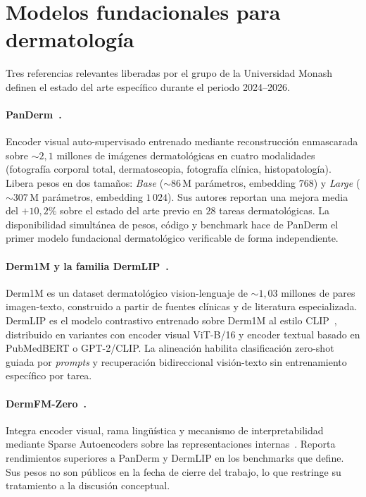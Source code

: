 \section{Modelos fundacionales para dermatología}
\label{sec:fundacionales-derma}

Tres referencias relevantes liberadas por el grupo de la Universidad
Monash definen el estado del arte específico durante el periodo
2024--2026.

\paragraph{PanDerm~\cite{panderm2025}.}
Encoder visual auto-supervisado entrenado mediante reconstrucción
enmascarada sobre $\sim 2{,}1$ millones de imágenes
dermatológicas en cuatro modalidades (fotografía corporal total,
dermatoscopia, fotografía clínica, histopatología). Libera pesos en
dos tamaños: \emph{Base} ($\sim 86$\,M parámetros, embedding
$768$) y \emph{Large} ($\sim 307$\,M parámetros, embedding
$1\,024$). Sus autores reportan una mejora media del
$+10{,}2\%$ sobre el estado del arte previo en $28$ tareas
dermatológicas. La disponibilidad simultánea de pesos, código y
benchmark hace de PanDerm el primer modelo fundacional dermatológico
verificable de forma independiente.

\paragraph{Derm1M y la familia DermLIP~\cite{derm1m}.}
Derm1M es un dataset dermatológico vision-lenguaje de
$\sim 1{,}03$ millones de pares imagen-texto, construido a
partir de fuentes clínicas y de literatura especializada. DermLIP es
el modelo contrastivo entrenado sobre Derm1M al estilo
CLIP~\cite{clip2021}, distribuido en variantes con encoder visual
ViT-B/16 y encoder textual basado en PubMedBERT o GPT-2/CLIP. La
alineación habilita clasificación zero-shot guiada por
\emph{prompts} y recuperación bidireccional visión-texto sin
entrenamiento específico por tarea.

\paragraph{DermFM-Zero~\cite{dermfmzero2026}.}
Integra encoder visual, rama lingüística y mecanismo de
interpretabilidad mediante Sparse Autoencoders sobre las
representaciones internas~\cite{templeton2024}. Reporta rendimientos
superiores a PanDerm y DermLIP en los benchmarks que define. Sus
pesos no son públicos en la fecha de cierre del trabajo, lo que
restringe su tratamiento a la discusión conceptual.

